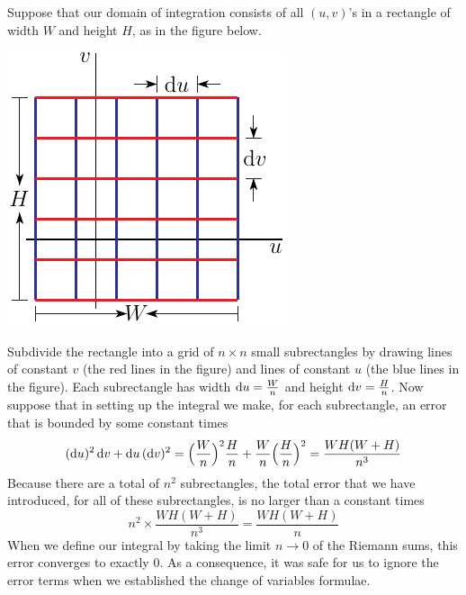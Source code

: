 Suppose that our domain of integration consists of all $(u,v)$'s 
in a rectangle of width $W$ and height $H$, as in the figure below.
\begin{nfig}
\begin{center}
    \includegraphics{slicing.pdf}
\end{center}
\end{nfig}
Subdivide the rectangle into a grid of $n\times n$ small subrectangles 
by drawing lines of constant $v$ (the red lines in the figure) and 
lines of constant $u$ (the blue lines in the figure).
Each subrectangle has width $\mathrm{d}u = \frac{W}{n}$ and height
$\mathrm{d}v = \frac{H}{n}$. Now suppose that in setting up the integral 
we make, for each subrectangle, an error that is bounded by some constant
times
\begin{equation*}
(\mathrm{d}u)^2\,\mathrm{d}v+\mathrm{d}u\,(\mathrm{d}v)^2
=\Big(\frac{W}{n}\Big)^2 \frac{H}{n}
 +  \frac{W}{n}\Big(\frac{H}{n}\Big)^2
=\frac{WH(W+H)}{n^3}
\end{equation*}
Because there are a total of $n^2$ subrectangles, the total error that 
we have introduced, for all of these subrectangles, is no larger than 
a constant times
\begin{equation*}
n^2 \times \frac{WH(W+H)}{n^3} = \frac{WH(W+H)}{n}
\end{equation*}
When we define our integral by taking the limit $n\rightarrow 0$ of 
the Riemann sums, this error converges to exactly $0$. As a consequence,
it was safe for us to ignore the error terms when we established the change
of variables formulae.






